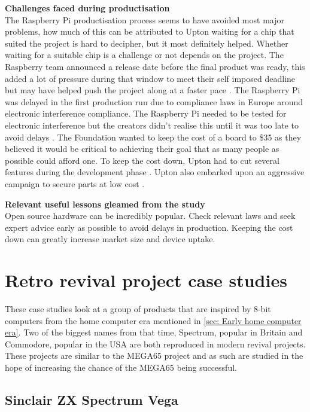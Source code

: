 \textbf{Challenges faced during productisation}\\
The Raspberry Pi productisation process seems to have avoided most major problems, how much of this can be attributed to Upton waiting for a chip that suited the project is hard to decipher, but it most definitely helped. Whether waiting for a suitable chip is a challenge or not depends on the project.
The Raspberry team announced a release date before the final product was ready, this added a lot of pressure during that window to meet their self imposed deadline but may have helped push the project along at a faster pace 
\cite{RN97}. 
The Raspberry Pi was delayed in the first production run due to compliance laws in Europe around electronic interference compliance. The Raspberry Pi needed to be tested for electronic interference but the creators didn't realise this until it was too late to avoid delays 
\cite{RN98}. The Foundation wanted to keep the cost of a board to \$35 as they believed it would be critical to achieving their goal that as many people as possible could afford one. To keep the cost down, Upton had to cut several features during the development phase 
\cite{RN98}. Upton also embarked upon an aggressive campaign to secure parts at low cost 
\cite{RN98}.

\textbf{Relevant useful lessons gleamed from the study}\\
Open source hardware can be incredibly popular. 
Check relevant laws and seek expert advice early as possible to avoid delays in production.
Keeping the cost down can greatly increase market size and device uptake. \\

\section{Retro revival project case studies}
These case studies look at a group of products that are inspired by 8-bit computers from the home computer era mentioned in \ref{sec: Early home computer era}. Two of the biggest names from that time, Spectrum, popular in Britain and Commodore, popular in the USA are both reproduced in modern revival projects. These projects are similar to the MEGA65 project and as such are studied in the hope of increasing the chance of the MEGA65 being successful. 

\subsection{Sinclair ZX Spectrum Vega}

